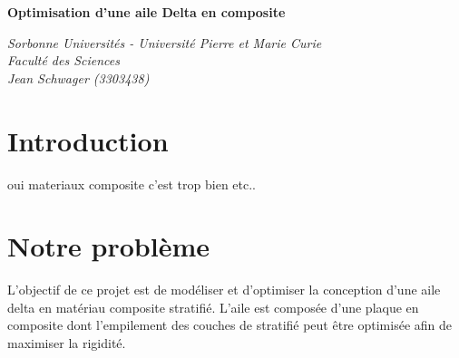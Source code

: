 \documentclass[12pt,a4paper]{article}
\begin{document}
\begin{titlepage}
\begin{center}
\vspace{40mm}


\Huge{\textbf{Optimisation d'une aile Delta en composite}}

\underline{\hspace{15cm}}

\large{\vspace{70mm}\textit{Sorbonne Universités - Université Pierre et Marie Curie\\
Faculté des Sciences\\}
\large{\textit{Jean Schwager (3303438)}} \\}
\end{center}
\end{titlepage}

\newpage
\tableofcontents


\newpage

\section{Introduction}
oui materiaux composite c'est trop bien etc..
\section{Notre problème}
L'objectif de ce projet est de modéliser et d'optimiser la conception d'une aile delta en matériau composite stratifié. L'aile est composée d'une plaque en composite dont l'empilement des couches de stratifié peut être optimisée afin de maximiser la rigidité. 										  
\end{document}
